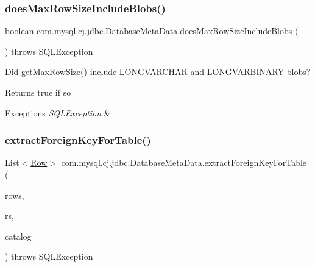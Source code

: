 \subsubsection{\texorpdfstring{does\+Max\+Row\+Size\+Include\+Blobs()}{doesMaxRowSizeIncludeBlobs()}}
{\footnotesize\ttfamily boolean com.\+mysql.\+cj.\+jdbc.\+Database\+Meta\+Data.\+does\+Max\+Row\+Size\+Include\+Blobs (\begin{DoxyParamCaption}{ }\end{DoxyParamCaption}) throws S\+Q\+L\+Exception}

Did \mbox{\hyperlink{classcom_1_1mysql_1_1cj_1_1jdbc_1_1_database_meta_data_ad4f6654c296ca5239cbe62b036363df3}{get\+Max\+Row\+Size()}} include L\+O\+N\+G\+V\+A\+R\+C\+H\+AR and L\+O\+N\+G\+V\+A\+R\+B\+I\+N\+A\+RY blobs?

\begin{DoxyReturn}{Returns}
true if so 
\end{DoxyReturn}

\begin{DoxyExceptions}{Exceptions}
{\em S\+Q\+L\+Exception} & \\
\hline
\end{DoxyExceptions}
\mbox{\label{classcom_1_1mysql_1_1cj_1_1jdbc_1_1_database_meta_data_ae35d518bf4a260021412630e03b1c03f}} 
\subsubsection{\texorpdfstring{extract\+Foreign\+Key\+For\+Table()}{extractForeignKeyForTable()}}
{\footnotesize\ttfamily List$<$\mbox{\hyperlink{interfacecom_1_1mysql_1_1cj_1_1result_1_1_row}{Row}}$>$ com.\+mysql.\+cj.\+jdbc.\+Database\+Meta\+Data.\+extract\+Foreign\+Key\+For\+Table (\begin{DoxyParamCaption}\item[{Array\+List$<$ \mbox{\hyperlink{interfacecom_1_1mysql_1_1cj_1_1result_1_1_row}{Row}} $>$}]{rows,  }\item[{java.\+sql.\+Result\+Set}]{rs,  }\item[{String}]{catalog }\end{DoxyParamCaption}) throws S\+Q\+L\+Exception}

